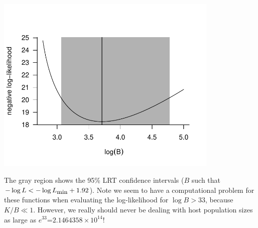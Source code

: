 \documentclass{article}\usepackage[]{graphicx}\usepackage[]{color}
\newenvironment{knitrout}{}{} %
\begin{document}
\begin{knitrout}
\color{fgcolor}
\includegraphics[width=0.8\textwidth]{figure/unnamed-chunk-1-1} 

\end{knitrout}

The gray region shows the 95\% LRT confidence intervals
($B$ such that $-\log L < -\log L_{\mbox{\small min}} + 1.92$).
Note we seem to have a computational
problem for these functions when evaluating the log-likelihood
for $\log B > 33$,
because $K/B \ll 1$. However, we really
should never be dealing with host population sizes
as large as $e^{33}$=\ensuremath{2.1464358\times 10^{14}}!
\end{document}

